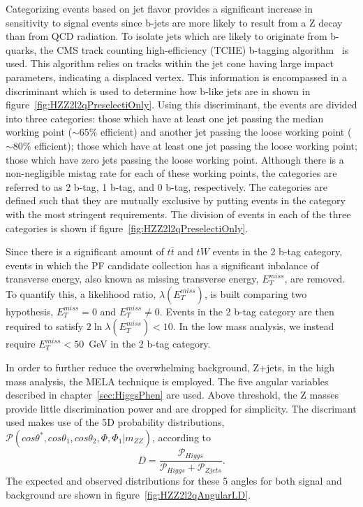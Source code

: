 Categorizing events based on jet flavor provides a significant 
increase in sensitivity to signal events since b-jets are 
more likely to result from a Z decay than from QCD radiation.  
To isolate jets which are likely to originate from b-quarks, the CMS track 
counting high-efficiency (TCHE) b-tagging algorithm~\cite{???} 
is used.  This algorithm relies on tracks within the jet cone having
large impact parameters, indicating a displaced vertex.  This information
is encompassed in a discriminant which is used
to determine how b-like jets are in shown in figure~\ref{fig:HZZ2l2qPreselectiOnly}.
Using this discriminant, the events are divided into three
categories: those which have at least one jet passing the median 
working point ($\sim65\%$ efficient) and another jet passing the
loose working point ($\sim80\%$ efficient); those which have at 
least one jet passing the loose working point; those which 
have zero jets passing the loose working point.  Although there 
is a non-negligible mistag rate for each of these working points, 
the categories are referred to as 2 b-tag, 1 b-tag, and 
0 b-tag, respectively. The categories are defined such that 
they are mutually exclusive by putting events in the category 
with the most stringent requirements.  The division of events
in each of the three categories is shown if 
figure~\ref{fig:HZZ2l2qPreselectiOnly}.

Since there is a significant amount of $t\bar{t}$ and $tW$ 
events in the 2 b-tag category, events in which the PF candidate
collection has a significant inbalance of transverse energy, 
also known as missing transverse energy, $E_T^{miss}$, are removed.
To quantify this, a likelihood ratio, $\lambda(E_T^{miss})$,
is built comparing two hypothesis, $E_T^{miss}=0$ and 
$E_T^{miss}\neq 0$.  Events in the 2 b-tag category are then 
required to satisfy $2\ln\lambda(E_T^{miss})<10$.  In the 
low mass analysis, we instead require $E_T^{miss}<50$~GeV in
the 2 b-tag category.    

In order to further reduce the overwhelming background, Z+jets,
in the high mass analysis, the MELA technique is employed.  
The five angular variables described in 
chapter~\ref{sec:HiggsPhen} are used.  Above threshold, the 
Z masses provide little discrimination power and are dropped 
for simplicity.  The discrimant used makes use of the 
5D probability distributions, 
$\mathscr{P}(cos\theta^*,cos\theta_1,cos\theta_2,\Phi,\Phi_1|m_{ZZ})$,
according to
\begin{equation}
D = \frac{\mathscr{P}_{Higgs}}{\mathscr{P}_{Higgs}+\mathscr{P}_{Zjets}}.
\label{eq:KD}
\end{equation}
The expected and observed
distributions for these 5 angles for both signal and background
are shown in figure~\ref{fig:HZZ2l2qAngularLD}.

